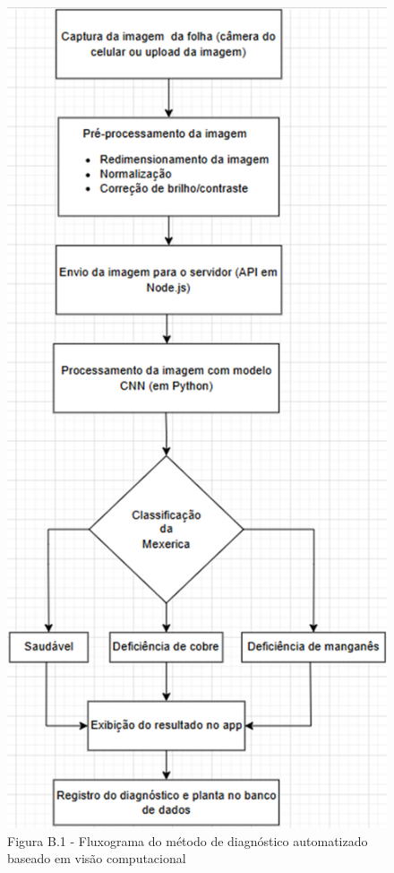 \begin{Appendix}
    \begin{figure}[H]
    \centering
    \caption{Figura B.1 -  Fluxograma do método de diagnóstico automatizado baseado em visão computacional}%
    \label{fig:fluxograma-metodo}
    \includegraphics[width=0.4\linewidth]{Illustrations/fluxograma1.png}
    \end{figure}
    
\end{Appendix}
    
    
\printindex%
    